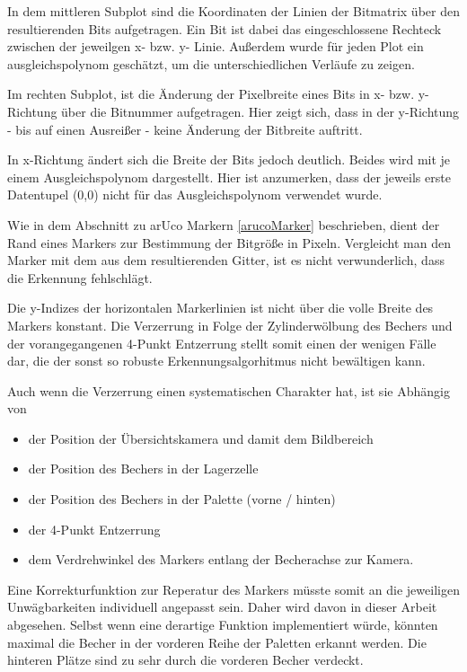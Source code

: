     In dem mittleren Subplot sind die Koordinaten der Linien der Bitmatrix über den resultierenden Bits aufgetragen. 
    Ein Bit ist dabei das eingeschlossene Rechteck zwischen der jeweilgen x- bzw. y- Linie. 
    Außerdem wurde für jeden Plot ein ausgleichspolynom geschätzt, um die unterschiedlichen Verläufe zu zeigen. 
    
    Im rechten Subplot, ist die Änderung der Pixelbreite eines Bits in x- bzw. y- Richtung über die Bitnummer aufgetragen.
    Hier zeigt sich, dass in der y-Richtung - bis auf einen Ausreißer - keine Änderung der Bitbreite auftritt. 
    
    In x-Richtung ändert sich die Breite der Bits jedoch deutlich.
    Beides wird mit je einem Ausgleichspolynom dargestellt. 
    Hier ist anzumerken, dass der jeweils erste Datentupel (0,0) nicht für das Ausgleichspolynom verwendet wurde. 

    Wie in dem Abschnitt zu arUco Markern \ref{arucoMarker} beschrieben, dient der Rand eines Markers zur Bestimmung der Bitgröße in Pixeln.
    Vergleicht man den Marker mit dem aus dem resultierenden Gitter, ist es nicht verwunderlich, dass die Erkennung fehlschlägt.

    Die y-Indizes der horizontalen Markerlinien ist nicht über die volle Breite des Markers konstant. 
    Die Verzerrung in Folge der Zylinderwölbung des Bechers  und der vorangegangenen 4-Punkt Entzerrung stellt somit einen der wenigen Fälle dar, 
    die der sonst so robuste Erkennungsalgorhitmus nicht bewältigen kann.

    Auch wenn die Verzerrung einen systematischen Charakter hat, ist sie Abhängig von
    \begin{itemize}
        \item der Position der Übersichtskamera und damit dem Bildbereich
        \item der Position des Bechers in der Lagerzelle
        \item der Position des Bechers in der Palette (vorne / hinten)
        \item der 4-Punkt Entzerrung
        \item dem Verdrehwinkel des Markers entlang der Becherachse zur Kamera.
    \end{itemize}

    Eine Korrekturfunktion zur Reperatur des Markers müsste somit an die jeweiligen Unwägbarkeiten individuell angepasst sein.
    Daher wird davon in dieser Arbeit abgesehen. 
    Selbst wenn eine derartige Funktion implementiert würde, könnten maximal die Becher in der vorderen Reihe der Paletten erkannt werden.
    Die hinteren Plätze sind zu sehr durch die vorderen Becher verdeckt.

